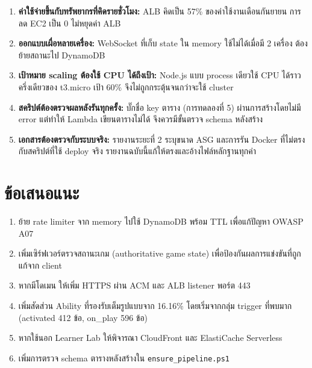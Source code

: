 \begin{enumerate}
    \item \textbf{ค่าใช้จ่ายขึ้นกับทรัพยากรที่คิดรายชั่วโมง:} ALB คิดเป็น 57\% ของค่าใช้งานเดือนกันยายน การลด EC2 เป็น 0 ไม่หยุดค่า ALB
    \item \textbf{ออกแบบเผื่อหลายเครื่อง:} WebSocket ที่เก็บ state ใน memory ใช้ไม่ได้เมื่อมี 2 เครื่อง ต้องย้ายสถานะไป DynamoDB
    \item \textbf{เป้าหมาย scaling ต้องใช้ CPU ได้ถึงเป้า:} Node.js แบบ process เดียวใช้ CPU ได้ราวครึ่งเดียวของ t3.micro เป้า 60\% จึงไม่ถูกกระตุ้นจนกว่าจะใช้ cluster
    \item \textbf{สคริปต์ต้องตรวจผลหลังรันทุกครั้ง:} บั๊กชื่อ key ตาราง (การทดลองที่ 5) ผ่านการสร้างโดยไม่มี error แต่ทำให้ Lambda เขียนตารางไม่ได้ จึงควรมีขั้นตรวจ schema หลังสร้าง
    \item \textbf{เอกสารต้องตรวจกับระบบจริง:} รายงานระยะที่ 2 ระบุขนาด ASG และการรัน Docker ที่ไม่ตรงกับสคริปต์ที่ใช้ deploy จริง รายงานฉบับนี้แก้ให้ตรงและอ้างไฟล์หลักฐานทุกค่า
\end{enumerate}

\section{ข้อเสนอแนะ}

\begin{enumerate}
    \item ย้าย rate limiter จาก memory ไปใช้ DynamoDB พร้อม TTL เพื่อแก้ปัญหา OWASP A07
    \item เพิ่มเซิร์ฟเวอร์ตรวจสถานะเกม (authoritative game state) เพื่อป้องกันผลการแข่งขันที่ถูกแก้จาก client
    \item หากมีโดเมน ให้เพิ่ม HTTPS ผ่าน ACM และ ALB listener พอร์ต 443
    \item เพิ่มสัดส่วน Ability ที่รองรับเต็มรูปแบบจาก 16.16\% โดยเริ่มจากกลุ่ม trigger ที่พบมาก (activated 412 ข้อ, on\_play 596 ข้อ)
    \item หากใช้นอก Learner Lab ให้พิจารณา CloudFront และ ElastiCache Serverless
    \item เพิ่มการตรวจ schema ตารางหลังสร้างใน \texttt{ensure\_pipeline.ps1}
\end{enumerate}
